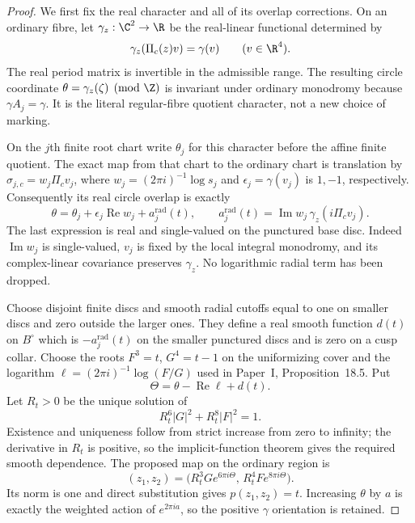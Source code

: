 \begin{proof}
We first fix the real character and all of its overlap corrections.
On an ordinary fibre, let
$\gamma_z:\C^2\to\R$ be the real-linear functional determined by
\[
 \gamma_z(\Pi_c(z)v)=\gamma(v)\qquad(v\in\R^4).
\]
The real period matrix is invertible in the admissible range.
The resulting circle coordinate
$\theta=\gamma_z(\zeta)\pmod\Z$ is invariant under ordinary
monodromy because $\gamma A_j=\gamma$. It is the literal
regular-fibre quotient character, not a new choice of marking.

On the $j$th finite root chart write $\theta_j$ for this
character before the affine finite quotient. The exact map from
that chart to the ordinary chart is translation by
$\sigma_{j,c}=w_j\Pi_cv_j$, where
$w_j=(2\pi i)^{-1}\log s_j$ and
$\epsilon_j=\gamma(v_j)$ is $1,-1$, respectively.
Consequently its real circle overlap is exactly
\begin{equation}\label{push:eq:C13-real-overlap}
 \theta=\theta_j+\epsilon_j\operatorname{Re}w_j+a_j^{\mathrm{rad}}(t),
 \qquad
 a_j^{\mathrm{rad}}(t)=\operatorname{Im}w_j\,
                  \gamma_z(i\Pi_cv_j).
\end{equation}
The last expression is real and single-valued on the punctured
base disc. Indeed $\operatorname{Im}w_j$ is single-valued,
$v_j$ is fixed by the local integral monodromy, and its
complex-linear covariance preserves $\gamma_z$.
No logarithmic radial term has been dropped.

Choose disjoint finite discs and smooth radial cutoffs equal to
one on smaller discs and zero outside the larger ones. They define
a real smooth function $d(t)$ on $B^\circ$ which is $-a_j^{\mathrm{rad}}(t)$
on the smaller punctured discs and is zero on a cusp collar.
Choose the roots $F^3=t$, $G^4=t-1$ on the uniformizing cover and
the logarithm $\ell=(2\pi i)^{-1}\log(F/G)$ used in Paper~I, Proposition~18.5.
Put
\[
 \Theta=\theta-\operatorname{Re}\ell+d(t).
\]
Let $R_t>0$ be the unique solution of
\[
 R_t^6|G|^2+R_t^8|F|^2=1.
\]
Existence and uniqueness follow from strict increase from zero
to infinity; the derivative in $R_t$ is positive, so the
implicit-function theorem gives the required smooth dependence.
The proposed map on the ordinary region is
\begin{equation}\label{push:eq:C13-weighted-map}
 (z_1,z_2)=
 \bigl(R_t^3G e^{6\pi i\Theta},\,
                R_t^4F e^{8\pi i\Theta}\bigr).
\end{equation}
Its norm is one and direct substitution gives $p(z_1,z_2)=t$.
Increasing $\theta$ by $a$ is exactly the weighted action of
$e^{2\pi ia}$, so the positive $\gamma$ orientation is retained.


\end{proof}
